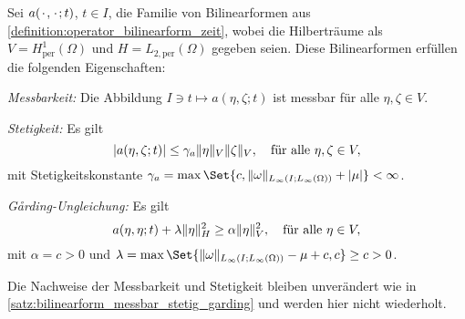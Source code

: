\documentclass[../main.tex]{subfiles}
\begin{document}
\begin{Lemma}
\label{lemma:bilinearform_periodisch_messbar_stetig_garding}
    Sei $a({\mkern2mu\cdot\mkern2mu}, {\mkern2mu\cdot\mkern2mu}; t)$, $t \in I$, die Familie von Bilinearformen aus \cref{definition:operator_bilinearform_zeit}, wobei die Hilberträume als $V = H^{1}_{\text{per}}(\Omega)$ und $H = L_{2,\text{per}}(\Omega)$ gegeben seien.
    Diese Bilinearformen erfüllen die folgenden Eigenschaften:
    \begin{thmenumerate}
        \item \label{lemma:bilinearform_periodisch_messbar_stetig_garding:messbar}
        \emph{Messbarkeit:} Die Abbildung $I \ni t \mapsto a(\eta, \zeta; t)$ ist messbar für alle $\eta, \zeta \in V$.
        \item\label{lemma:bilinearform_periodisch_messbar_stetig_garding:stetig}
        \emph{Stetigkeit:} Es gilt
        \begin{equation}
            \label{eq:bilinearform_periodisch_messbar_stetig_garding:stetig}
            \abs{a(\eta, \zeta; t)} \leq \gamma_{a} \norm{\eta}_{V} \norm{\zeta}_{V}, \quad \fa \eta, \zeta \in V,
        \end{equation}
        mit Stetigkeitskonstante $\gamma_{a} = \max\Set{c, \norm{\omega}_{L_{\infty}(I; L_{\infty}(\Omega))} + \abs{\mu}} < \infty$.
        \item\label{lemma:bilinearform_periodisch_messbar_stetig_garding:garding}
        \emph{G\aa{}rding-Ungleichung:} Es gilt
        \begin{equation}
            \label{eq:bilinearform_periodisch_messbar_stetig_garding:garding}
            a(\eta, \eta; t) + \lambda \norm{\eta}_{H}^{2} \geq \alpha \norm{\eta}_{V}^{2}, \quad \fa \eta \in V,
        \end{equation}
        mit $\alpha = c > 0$ und $\lambda = \max\Set{\norm{\omega}_{L_{\infty}(I;L_{\infty}(\Omega))} - \mu + c, c} \geq c > 0$.
    \end{thmenumerate}

    \begin{Beweis}
        Die Nachweise der Messbarkeit und Stetigkeit bleiben unverändert wie in \cref{satz:bilinearform_messbar_stetig_garding} und werden hier nicht wiederholt.


\end{Beweis}
\end{Lemma}
\end{document}

